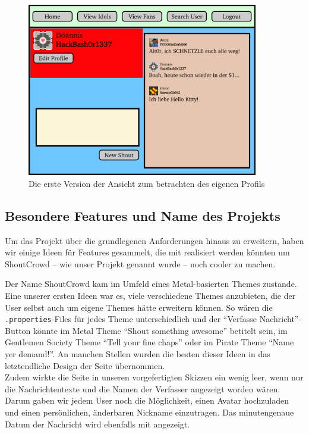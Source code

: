 \documentclass[12pt,a4paper]{article}
\begin{document}
\begin{figure}[h!]
\begin{center}
\includegraphics[width=0.9\textwidth]{entwurf.png}
\caption{Die erste Version der Ansicht zum betrachten des eigenen Profils}
\end{center}
\end{figure}


\subsection{Besondere Features und Name des Projekts}
Um das Projekt über die grundlegenen Anforderungen hinaus zu erweitern, haben wir einige Ideen für Features gesammelt, die mit realisiert werden könnten um ShoutCrowd -- wie unser Projekt genannt wurde -- noch cooler zu machen.

Der Name ShoutCrowd kam im Umfeld eines Metal-basierten Themes zustande. Eine unserer ersten Ideen war es, viele verschiedene Themes anzubieten, die der User selbst auch um eigene Themes hätte erweitern können. So wären die \verb+.properties+-Files für jedes Theme unterschiedlich und der ``Verfasse Nachricht''-Button könnte im Metal Theme ``Shout something awesome'' betitelt sein, im Gentlemen Society Theme ``Tell your fine chaps'' oder im Pirate Theme ``Name yer demand!''. An manchen Stellen wurden die besten dieser Ideen in das letztendliche Design der Seite übernommen. \\

Zudem wirkte die Seite in unseren vorgefertigten Skizzen ein wenig leer, wenn nur die Nachrichtentexte und die Namen der Verfasser angezeigt worden wären. Darum gaben wir jedem User noch die Möglichkeit, einen Avatar hochzuladen und einen persönlichen, änderbaren Nickname einzutragen. Das minutengenaue Datum der Nachricht wird ebenfalls mit angezeigt.
\end{document}
